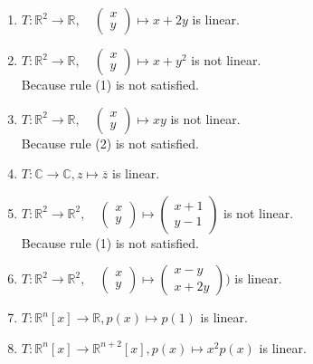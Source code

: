 \documentclass{article}
\begin{document}
\begin{enumerate}
    \item \( T: \mathbb{R}^2 \to \mathbb{R}, \quad \begin{pmatrix} x \\ y \end{pmatrix} \mapsto x + 2y \) is linear.
    \item \( T: \mathbb{R}^2 \to \mathbb{R}, \quad \begin{pmatrix} x \\ y \end{pmatrix} \mapsto x + y^2 \) is not linear. \\
    Because rule (1) is not satisfied.
    \item \( T: \mathbb{R}^2 \to \mathbb{R}, \quad \begin{pmatrix} x \\ y \end{pmatrix} \mapsto xy \) is not linear. \\
    Because rule (2) is not satisfied.
    \item \( T: \mathbb{C} \to \mathbb{C}, z \mapsto \overline{z} \) is linear.
    \item \( T: \mathbb{R}^2 \to \mathbb{R}^2, \quad \begin{pmatrix} x \\ y \end{pmatrix} \mapsto \begin{pmatrix} x + 1 \\ y - 1 \end{pmatrix} \) is not linear. \\
      Because rule (1) is not satisfied.
    \item \( T: \mathbb{R}^2 \to \mathbb{R}^2, \quad \begin{pmatrix} x \\ y \end{pmatrix} \mapsto \begin{pmatrix} x - y \\ x + 2y\end{pmatrix}  )\) is linear.
    \item \( T: \mathbb{R}^n[x] \to \mathbb{R}, p(x) \mapsto p(1) \) is linear.
    \item \( T: \mathbb{R}^n[x] \to \mathbb{R}^{n+2}[x], p(x) \mapsto x^2p(x) \) is linear.
\end{enumerate}
\end{document}
